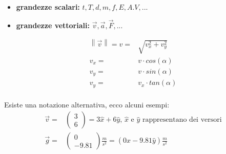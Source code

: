 \documentclass[../main.tex]{subfiles}
\begin{document}
\begin{itemize}
    \item \textbf{grandezze scalari:} $t,T,d,m,f,E,A.V,...$
    \item \textbf{grandezze vettoriali:} $\vec{v}, \vec{a}, \vec{F}, ...$
\end{itemize}

\vspace{1cm}
\begin{center}
\end{center}

\begin{align*}
    \left\lVert \vec{v}\right\rVert = v =& \sqrt{v_x^2 + v_y^2} \\
    v_x =& v \cdot cos(\alpha) \\
    v_y =& v \cdot sin(\alpha) \\
    v_y =& v_x \cdot tan(\alpha) \\
\end{align*}

Esiste una notazione alternativa, ecco alcuni esempi:
\begin{align*}
    \vec{v} =& \begin{pmatrix}
        3 \\
        6
    \end{pmatrix}
    = 3\hat{x} + 6\hat{y} \text{, $\hat{x}$ e $\hat{y}$ rappresentano dei versori} \\
    \vec{g} =& \begin{pmatrix}
        0 \\
        -9.81
    \end{pmatrix} \frac{m}{s^2}
    =(0\hat{x} - 9.81\hat{y}) \frac{m}{s^2}
\end{align*}
\end{document}

